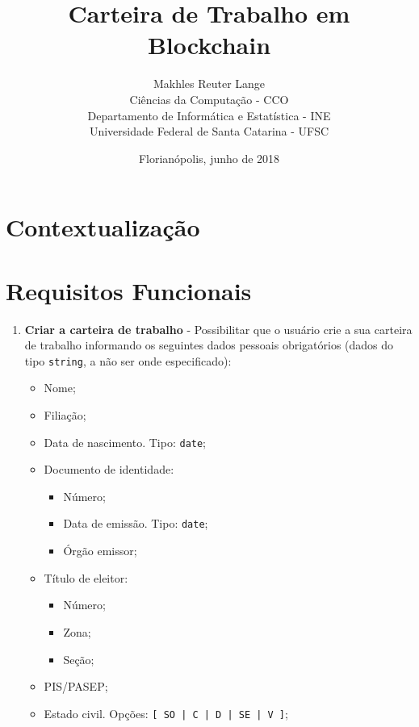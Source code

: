 \documentclass[a4paper,10pt]{article}
\author{Makhles Reuter Lange \\
        Ciências da Computação - CCO \\
        Departamento de Informática e Estatística - INE \\
        Universidade Federal de Santa Catarina - UFSC}
\title{Carteira de Trabalho em Blockchain}
\date{Florianópolis, junho de 2018}
\begin{document}
\maketitle

\section{Contextualização}
\section{Requisitos Funcionais}

\begin{enumerate}
  \item \textbf{Criar a carteira de trabalho} - Possibilitar que o usuário crie a sua carteira de trabalho informando os seguintes dados pessoais obrigatórios (dados do tipo \texttt{string}, a não ser onde especificado):
    \begin{itemize}
      \item Nome;
      \item Filiação;
      \item Data de nascimento. Tipo: \texttt{date};
      \item Documento de identidade:
      \begin{itemize}
        \item Número;
        \item Data de emissão. Tipo: \texttt{date};
        \item Órgão emissor;
      \end{itemize}
      \item Título de eleitor:
      \begin{itemize}
        \item Número;
        \item Zona;
        \item Seção;
      \end{itemize}
      \item PIS/PASEP;
      \item Estado civil. Opções: \texttt{[ SO | C | D | SE | V ]};

\end{itemize}
\end{enumerate}
\end{document}
